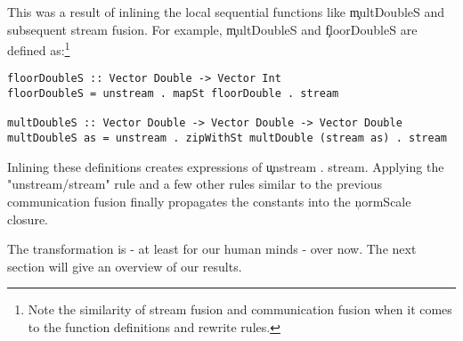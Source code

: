      This was a result of inlining the local sequential functions like \c{multDoubleS}
     and subsequent stream fusion. For example, \c{multDoubleS} and \c{floorDoubleS} are defined as:\footnote{Note the similarity of stream fusion and communication fusion when it comes to the function definitions and rewrite rules.}
     \begin{lstlisting}
floorDoubleS :: Vector Double -> Vector Int
floorDoubleS = unstream . mapSt floorDouble . stream

multDoubleS :: Vector Double -> Vector Double -> Vector Double
multDoubleS as = unstream . zipWithSt multDouble (stream as) . stream
     \end{lstlisting}
     Inlining these definitions creates expressions of \c{unstream . stream}. Applying
     the "unstream/stream" rule and a few other rules similar to the previous
     communication fusion finally propagates the constants into the
     \c{normScale} closure.
     
     The transformation is - at least for our human minds - over now. The next
     section will give an overview of our results.
         
